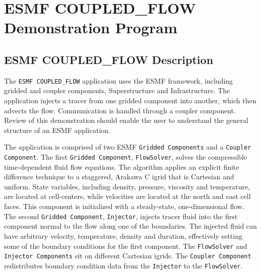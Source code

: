 

\section{ESMF COUPLED\_FLOW Demonstration Program}
\label{sec:demo}

\subsection{ESMF COUPLED\_FLOW Description}

The {\tt ESMF COUPLED\_FLOW} application uses the ESMF framework, including 
gridded and coupler components, Superstructure and Infrastructure. 
The application injects a tracer from one gridded
component into another, which then advects the flow.  Communication is handled through a
coupler component.  Review of this demonstration should enable the user to
understand the general structure of an ESMF application.

 
The application is comprised of two ESMF 
{\tt Gridded Components} and a {\tt Coupler Component}.  
The first {\tt Gridded Component}, {\tt FlowSolver}, solves the compressible 
time-dependent fluid flow equations.  The algorithm 
applies an explicit finite difference technique to a staggered, Arakawa C igrid 
that is Cartesian and uniform.  State variables, including density, 
pressure, viscosity and temperature, are located at cell-centers, while 
velocities are located at the north and east cell faces.  This component is initialized 
with a steady-state, one-dimensional flow.  The second {\tt Gridded 
Component}, {\tt Injector}, injects tracer fluid into the first component normal to the 
flow along 
one of the boundaries.  The injected fluid can have arbitrary velocity, 
temperature, density and duration, effectively setting some of 
the boundary conditions for the first component.  The {\tt FlowSolver} and 
{\tt Injector Components} sit on different Cartesian igrids.  The
{\tt Coupler Component} redistributes boundary condition data from 
the {\tt Injector} to the {\tt FlowSolver}.

